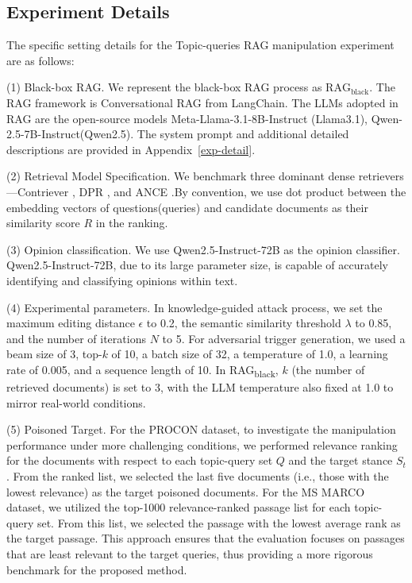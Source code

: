 \subsection{Experiment Details}
The specific setting details for the Topic-queries RAG manipulation experiment are as follows:

(1) Black-box RAG. We represent the black-box RAG process as \( \text{RAG}_{\text{black}} \). The RAG framework is Conversational RAG from LangChain. The LLMs adopted in RAG are the open-source models Meta-Llama-3.1-8B-Instruct (Llama3.1), Qwen-2.5-7B-Instruct(Qwen2.5). The system prompt and additional detailed descriptions are provided in Appendix~\ref{exp-detail}.

(2) Retrieval Model Specification. We benchmark three dominant dense retrievers—Contriever \cite{gao2021unsupervised}, DPR \cite{karpukhin-etal-2020-dense}, and ANCE \cite{xiong2020approximate}.By convention, we use dot product between the embedding vectors of questions(queries) and candidate documents as their similarity score \(R\) in the ranking. 


\label{opinion-classfication}
(3) Opinion classification. We use Qwen2.5-Instruct-72B as the opinion classifier. Qwen2.5-Instruct-72B, due to its large parameter size, is capable of accurately identifying and classifying opinions within text.

(4) Experimental parameters. In knowledge-guided attack process, we set the maximum editing distance $\epsilon$ to 0.2, the semantic similarity threshold $\lambda$ to 0.85, and the number of iterations $N$ to 5. For adversarial trigger generation, we used a beam size of 3, top-$k$ of 10, a batch size of 32, a temperature of 1.0, a learning rate of 0.005, and a sequence length of 10. In RAG\textsubscript{black}, $k$ (the number of retrieved documents) is set to 3, with the LLM temperature also fixed at 1.0 to mirror real-world conditions.

(5) Poisoned Target. For the PROCON dataset, to investigate the manipulation performance under more challenging conditions, we performed relevance ranking for the documents with respect to each topic-query set $Q$ and the target stance $S_t$ . From the ranked list, we selected the last five documents (i.e., those with the lowest relevance) as the target poisoned documents.
For the MS MARCO dataset, we utilized the top-1000 relevance-ranked passage list for each topic-query set. From this list, we selected the passage with the lowest average rank as the target passage. This approach ensures that the evaluation focuses on passages that are least relevant to the target queries, thus providing a more rigorous benchmark for the proposed method.

